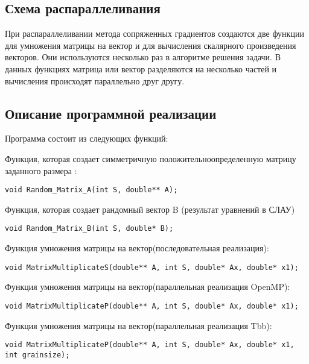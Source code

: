 \documentclass{report}
\begin{document}
\newpage

\begin{center}
\section*{Схема распараллеливания}
\end{center}
При распараллеливании метода сопряженных градиентов создаются две функции для умножения матрицы на вектор и для вычисления скалярного произведения векторов. Они используются несколько раз в алгоритме решения задачи. В данных функциях матрица или вектор разделяются на несколько частей и вычисления происходят параллельно друг другу.
\newpage

\begin{center}
\section*{Описание программной реализации}
\end{center}
\par Программа состоит из следующих функций:
\par Функция, которая создает симметричную положительноопределенную матрицу заданного размера :
\begin{lstlisting}
void Random_Matrix_A(int S, double** A);
\end{lstlisting}
\par Функция, которая создает рандомный вектор B (результат уравнений в СЛАУ)
\begin{lstlisting}
void Random_Matrix_B(int S, double* B);
\end{lstlisting}
\par Функция умножения матрицы на вектор(последовательная реализация):
\begin{lstlisting}
void MatrixMultiplicateS(double** A, int S, double* Ax, double* x1);
\end{lstlisting}
\par Функция умножения матрицы на вектор(параллельная реализация OpenMP):
\begin{lstlisting}
void MatrixMultiplicateP(double** A, int S, double* Ax, double* x1);
\end{lstlisting}
\par Функция умножения матрицы на вектор(параллельная реализация Tbb):
\begin{lstlisting}
void MatrixMultiplicateP(double** A, int S, double* Ax, double* x1, int grainsize);
\end{lstlisting}
\end{document}
